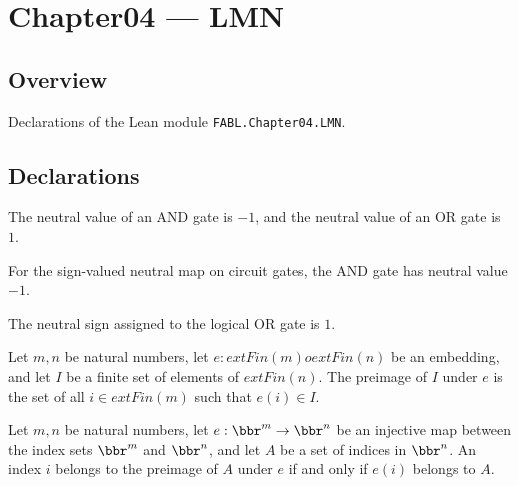 \chapter{Chapter04 — LMN}
\section{Overview}

Declarations of the Lean module \texttt{FABL.Chapter04.LMN}.

\section{Declarations}

\begin{definition}
\label{FABL.CircuitGate.neutral}
\leanok
{}
The neutral value of an AND gate is $-1$, and the neutral value of an OR gate is $1$.
\end{definition}

\begin{theorem}
\label{FABL.CircuitGate.neutral_and}
\leanok
{}
For the sign-valued neutral map on circuit gates, the AND gate has neutral value $-1$.
\end{theorem}

\begin{theorem}
\label{FABL.CircuitGate.neutral_or}
\leanok
{}
The neutral sign assigned to the logical OR gate is $1$.
\end{theorem}

\begin{definition}
\label{FABL.embeddingPreimage}
\leanok
Let $m,n$ be natural numbers, let $e:	ext{Fin}(m)	o	ext{Fin}(n)$ be an embedding, and
let $I$ be a finite set of elements of $	ext{Fin}(n)$. The preimage of $I$ under $e$ is
the set of all $i\in	ext{Fin}(m)$ such that $e(i)\in I$.
\end{definition}

\begin{theorem}
\label{FABL.mem_embeddingPreimage}
\leanok
{}
Let $m,n$ be natural numbers, let $e:\bbr^{m}\to\bbr^{n}$ be an injective map between the
index sets $\bbr^{m}$ and $\bbr^{n}$, and let $A$ be a set of indices in $\bbr^{n}$. An
index $i$ belongs to the preimage of $A$ under $e$ if and only if $e(i)$ belongs to $A$.
\end{theorem}

